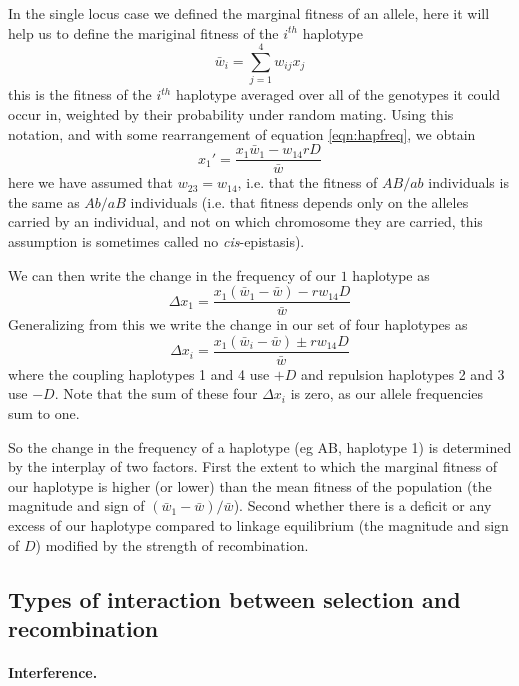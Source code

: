 In the single locus case we defined the marginal fitness of an allele, here it will help us to define the mariginal fitness of the $i^{th}$ haplotype
\begin{equation}
\bar{w}_i = \sum_{j=1}^4 w_{ij} x_j
\end{equation}
this is the fitness of the $i^{th}$ haplotype averaged over all of the genotypes it could occur in, weighted by their probability under random mating. Using this notation, and with some rearrangement of equation \eqref{eqn:hapfreq}, we obtain
\begin{equation}
x_1' = \frac{x_1\bar{w}_1 - w_{14} r D}{\bar{w}}
\end{equation}
here we have assumed that $w_{23}=w_{14}$, i.e. that the fitness of $AB/ab$ individuals is the same as $Ab/aB$ individuals (i.e. that fitness depends only on the alleles carried by an individual, and not on which chromosome they are carried, this assumption is sometimes called no {\it cis}-epistasis). 

We can then write the change in the frequency of our $1$ haplotype as 
\begin{equation}
\Delta x_1= \frac{x_1(\bar{w}_1-\bar{w}) -r w_{14} D}{\bar{w}}
\end{equation}
Generalizing from this we write the change in our set of four haplotypes as
\begin{equation}
\Delta x_i= \frac{x_1(\bar{w}_i-\bar{w}) \pm r w_{14} D}{\bar{w}}
\end{equation}
where the coupling haplotypes 1 and 4 use $+D$ and repulsion haplotypes 2 and 3 use $-D$. Note that the sum of these four $\Delta x_i$ is zero, as our allele frequencies sum to one.

So the change in the frequency of a haplotype (eg AB, haplotype 1) is determined by the interplay of two factors. First the extent to which  the marginal fitness of our haplotype is higher (or lower) than the mean fitness of the population (the magnitude and sign of $(\bar{w}_1-\bar{w})/\bar{w}$). Second whether there is a deficit or any excess of our haplotype compared to linkage equilibrium (the magnitude and sign of $D$) modified by the strength of recombination. 

\subsection{Types of interaction between selection and recombination}

\paragraph{Interference.}



